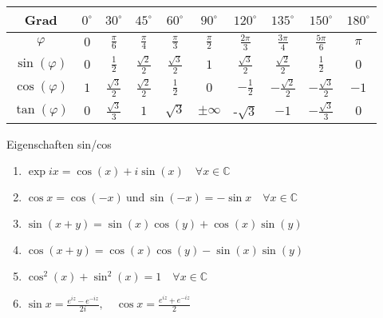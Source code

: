 \begin{center}
    \renewcommand{\arraystretch}{1.3}
    \setlength{\tabcolsep}{4pt}
    \begin{tabular}{|c|c|c|c|c|c|c|c|c|c|}
        \hline
        Grad            & $0^\circ$ & $30^\circ$           & $45^\circ$           & $60^\circ$           & $90^\circ$      & $120^\circ$          & $135^\circ$           & $150^\circ$           & $180^\circ$ \\
        \hline
        $\varphi$       & $0$       & $\frac{\pi}{6}$      & $\frac{\pi}{4}$      & $\frac{\pi}{3}$      & $\frac{\pi}{2}$ & $\frac{2\pi}{3}$     & $\frac{3\pi}{4}$      & $\frac{5\pi}{6}$      & $\pi$       \\
        \hline
        $\sin(\varphi)$ & $0$       & $\frac{1}{2}$        & $\frac{\sqrt{2}}{2}$ & $\frac{\sqrt{3}}{2}$ & $1$             & $\frac{\sqrt{3}}{2}$ & $\frac{\sqrt{2}}{2}$  & $\frac{1}{2}$         & $0$         \\
        \hline
        $\cos(\varphi)$ & $1$       & $\frac{\sqrt{3}}{2}$ & $\frac{\sqrt{2}}{2}$ & $\frac{1}{2}$        & $0$             & $-\frac{1}{2}$       & $-\frac{\sqrt{2}}{2}$ & $-\frac{\sqrt{3}}{2}$ & $-1$        \\
        \hline
        $\tan(\varphi)$ & $0$       & $\frac{\sqrt{3}}{3}$ & $1$                  & $\sqrt{3}$           & $\pm \infty$    & -$\sqrt{3}$          & $-1$                  & $-\frac{\sqrt{3}}{3}$ & $0$         \\
        \hline
    \end{tabular}
\end{center}

\begin{theorem}{Eigenschaften sin/cos}
   \begin{enumerate}
       \item $\exp ix = \cos(x) + i \sin(x) \quad \forall x \in \mathbb{C}$
       \item $\cos x = \cos(-x) ~\text{und}~ \sin(-x) = -\sin x \quad\forall x \in \mathbb{C}$
       \item $\sin(x + y) = \sin(x)\cos(y) + \cos(x)\sin(y)$
       \item $\cos(x + y) = \cos(x)\cos(y) - \sin(x)\sin(y)$
       \item $\cos^2(x) + \sin^2(x) = 1 \quad \forall x \in \mathbb{C}$
       \item $\sin x = \frac{e^{iz} - e^{-iz}}{2i}, \quad \cos x = \frac{e^{iz} + e^{-iz}}{2}$
   \end{enumerate}
\end{theorem}

